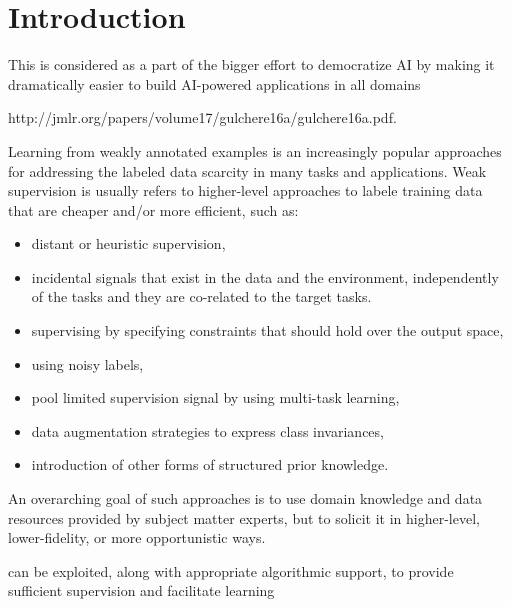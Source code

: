 \chapter{Introduction}


This is considered as a part of the bigger effort to democratize AI by making it dramatically easier to build AI-powered applications in all domains



http://jmlr.org/papers/volume17/gulchere16a/gulchere16a.pdf.


Learning from weakly annotated examples is an increasingly popular approaches for addressing the labeled data scarcity in many tasks and applications. 
Weak supervision is usually refers to higher-level approaches to labele training data that are cheaper and/or more efficient, such as:
\begin{itemize}
    \item distant or heuristic supervision,
    \item incidental signals that  exist in the data and the environment, independently of the tasks and they are co-related to the target tasks.
    \item supervising by specifying constraints that should hold over the output space,
    \item using noisy labels, 
    \item pool limited supervision signal by using multi-task learning,
    \item data augmentation strategies to express class invariances,
    \item introduction of other forms of structured prior knowledge.
\end{itemize}
An overarching goal of such approaches is to use domain knowledge and data resources provided by subject matter experts, but to solicit it in higher-level, lower-fidelity, or more opportunistic ways.

can be exploited, along with appropriate algorithmic support, to provide sufficient supervision and facilitate learning




